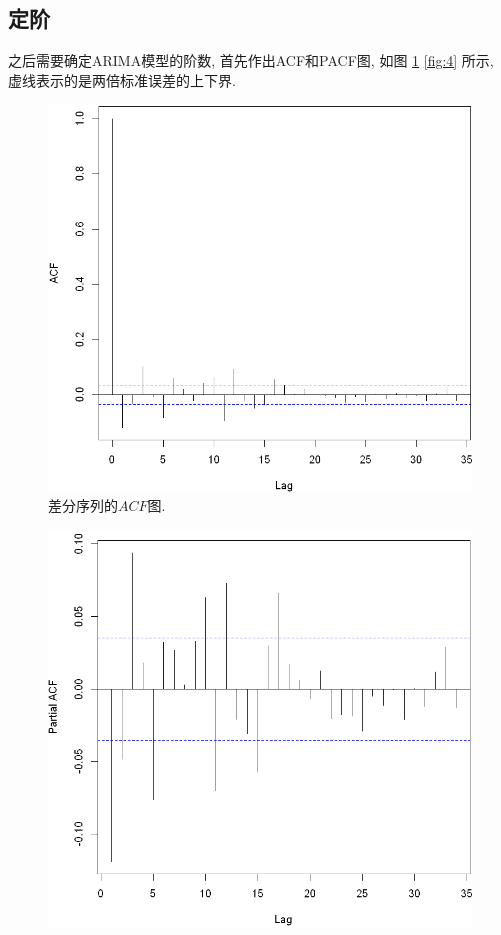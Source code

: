 \documentclass[11pt]{article}
\begin{document}
\subsection{定阶}
\qquad 之后需要确定ARIMA模型的阶数, 首先作出ACF和PACF图, 如图 \ref{fig:3} \ref{fig:4} 所示, 虚线表示的是两倍标准误差的上下界. 
\begin{center}
    \hspace{30pt}\begin{minipage}{0.35\textwidth}
        \begin{figure}
            \centering
            \hspace{-30pt}\includegraphics[width=.95\textwidth]{output_8_0}
            \caption{差分序列的$ACF$图.\label{fig:3}}
        \end{figure}
    \end{minipage}
    \begin{minipage}{0.35\textwidth}
        \begin{figure}
            \centering
            \hspace{-25pt}\includegraphics[width=.95\textwidth]{output_9_0}

\end{figure}
\end{minipage}
\end{center}
\end{document}
